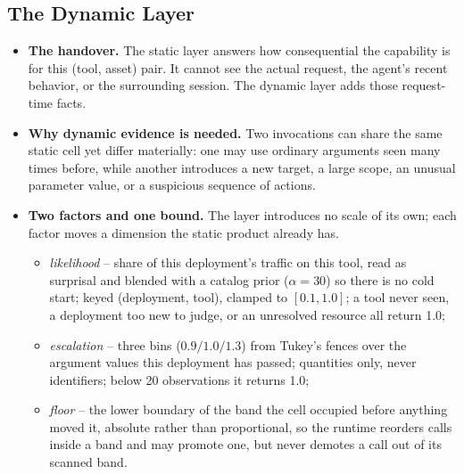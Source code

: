 \subsection{The Dynamic Layer}
\label{sec:dynamic}
\begin{itemize}
  \item \textbf{The handover.} The static layer answers how consequential the
        capability is for this (tool, asset) pair. It cannot see the actual
        request, the agent's recent behavior, or the surrounding session. The
        dynamic layer adds those request-time facts.

  \item \textbf{Why dynamic evidence is needed.} Two invocations can share the
        same static cell yet differ materially: one may use ordinary arguments
        seen many times before, while another introduces a new target, a large
        scope, an unusual parameter value, or a suspicious sequence of actions.

  \item \textbf{Two factors and one bound.} The layer introduces no scale of
        its own; each factor moves a dimension the static product already has.
    \begin{itemize}
      \item \emph{likelihood} -- share of this deployment's traffic on this
            tool, read as surprisal and blended with a catalog prior
            ($\alpha = 30$) so there is no cold start; keyed
            (deployment, tool), clamped to $[0.1, 1.0]$; a tool never seen, a
            deployment too new to judge, or an unresolved resource all return
            1.0;
      \item \emph{escalation} -- three bins ($0.9 / 1.0 / 1.3$) from Tukey's
            fences over the argument values this deployment has passed;
            quantities only, never identifiers; below 20 observations it
            returns 1.0;
      \item \emph{floor} -- the lower boundary of the band the cell occupied
            before anything moved it, absolute rather than proportional, so
            the runtime reorders calls inside a band and may promote one, but
            never demotes a call out of its scanned band.
    \end{itemize}


\end{itemize}
